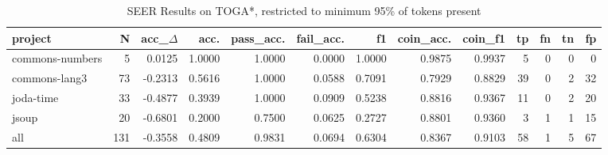 \begin{table*}
\centering
\caption{SEER Results on TOGA*, restricted to minimum 95\% of tokens present}
\label{tab:toga_results_05}
\begin{tabular}{lrrrrrrrrrrrr}
\toprule
         project &    N &  acc\_$\Delta$ &    acc. &  pass\_acc. &  fail\_acc. &      f1 &  coin\_acc. &  coin\_f1 &  tp &  fn &  tn &  fp \\
\midrule
 commons-numbers &    5 &      0.0125 &  1.0000 &     1.0000 &     0.0000 &  1.0000 &     0.9875 &   0.9937 &   5 &   0 &   0 &   0 \\
   commons-lang3 &   73 &     -0.2313 &  0.5616 &     1.0000 &     0.0588 &  0.7091 &     0.7929 &   0.8829 &  39 &   0 &   2 &  32 \\
       joda-time &   33 &     -0.4877 &  0.3939 &     1.0000 &     0.0909 &  0.5238 &     0.8816 &   0.9367 &  11 &   0 &   2 &  20 \\
           jsoup &   20 &     -0.6801 &  0.2000 &     0.7500 &     0.0625 &  0.2727 &     0.8801 &   0.9360 &   3 &   1 &   1 &  15 \\
             all &  131 &     -0.3558 &  0.4809 &     0.9831 &     0.0694 &  0.6304 &     0.8367 &   0.9103 &  58 &   1 &   5 &  67 \\
\bottomrule
\end{tabular}
\end{table*}
